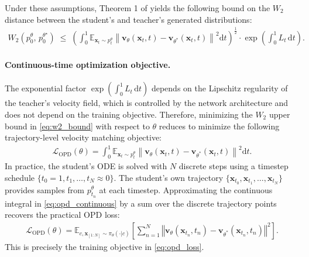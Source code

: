 \documentclass{llmxive}
\providecommand{\bm}[1]{\boldsymbol{#1}}
\providecommand{\mathbf}[1]{\bm{#1}}
\begin{document}
Under these assumptions, Theorem 1 of \citet{benton2023error} yields the following bound on the $W_2$ distance between the student's and teacher's generated distributions:
\begin{align}
    W_2(p_0^\theta, \, p_0^{\theta^\star}) \;\leq\; \left(\int_0^1 \mathbb{E}_{\mathbf{x}_t \sim p_t^{\theta}} \left\| \mathbf{v}_\theta(\mathbf{x}_t, t) - \mathbf{v}_{\theta^*}(\mathbf{x}_t, t) \right\|^2 \mathrm{d}t\right)^{\frac{1}{2}} \cdot \exp\!\left(\int_0^1 L_t \,\mathrm{d}t\right).
    \label{eq:w2_bound}
\end{align}

\paragraph{Continuous-time optimization objective.} The exponential factor $\exp\!\left(\int_0^1 L_t \,\mathrm{d}t\right)$ depends on the Lipschitz regularity of the teacher's velocity field, which is controlled by the network architecture and does not depend on the training objective. Therefore, minimizing the $W_2$ upper bound in \cref{eq:w2_bound} with respect to $\theta$ reduces to minimize the following trajectory-level velocity matching objective:
\begin{align}
   \mathcal{L}_{\text{OPD}}(\theta) = \int_0^1 \mathbb{E}_{\mathbf{x}_t \sim p_t^{\theta}} \left\| \mathbf{v}_\theta(\mathbf{x}_t, t) - \mathbf{v}_{\theta^*}(\mathbf{x}_t, t) \right\|^2 \mathrm{d}t.
    \label{eq:opd_continuous}
\end{align}
In practice, the student's ODE is solved with $N$ discrete steps using a timestep schedule $\{t_0 = 1, t_1, \ldots, t_N \approx 0\}$. The student's own trajectory $\{\mathbf{x}_{t_0}, \mathbf{x}_{t_1}, \ldots, \mathbf{x}_{t_N}\}$ provides samples from $p_{t_n}^\theta$ at each timestep. Approximating the continuous integral in \cref{eq:opd_continuous} by a sum over the discrete trajectory points recovers the practical OPD loss:
\begin{align}
    \mathcal{L}_{\text{OPD}}(\theta) = \mathbb{E}_{c,\mathbf{x}_{[1:N]}\sim \pi_\theta(\cdot|c)}\left[\sum_{n =1}^N \left\Vert \mathbf{v}_\theta(\mathbf{x}_{t_n}, t_n) - \mathbf{v}_{\theta^*}(\mathbf{x}_{t_n}, t_n) \right\Vert^2\right].
\end{align}
This is precisely the training objective in \cref{eq:opd_loss}.




\end{document}
